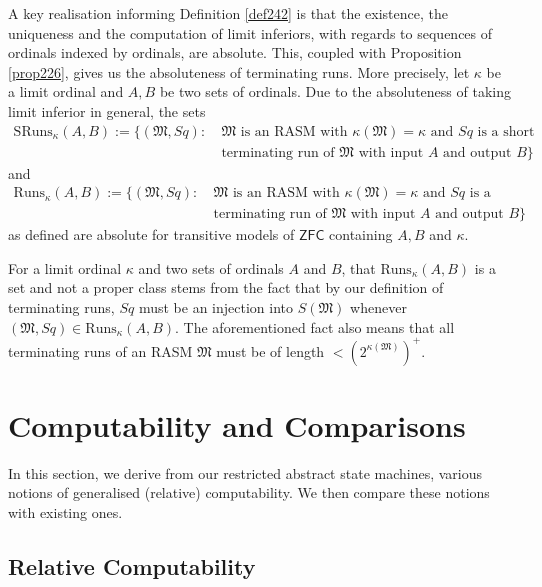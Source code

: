 \documentclass[12pt]{article}
\numberwithin{equation}{section}
\begin{document}
A key realisation informing Definition \ref{def242} is that the existence, the uniqueness and the computation of limit inferiors, with regards to sequences of ordinals indexed by ordinals, are absolute. This, coupled with Proposition \ref{prop226}, gives us the absoluteness of terminating runs. More precisely, let $\kappa$ be a limit ordinal and $A, B$ be two sets of ordinals. Due to the absoluteness of taking limit inferior in general, the sets
\begin{align*}
    \mathrm{SRuns}_{\kappa}(A, B) := \{(\mathfrak{M}, Sq) : \ & \mathfrak{M} \text{ is an RASM with } \kappa(\mathfrak{M}) = \kappa \text{ and } Sq \text{ is a short} \\
    & \text{terminating run of } \mathfrak{M} \text{ with input } A \text{ and output } B\}
\end{align*}
and
\begin{align*}
    \mathrm{Runs}_{\kappa}(A, B) := \{(\mathfrak{M}, Sq) : \ & \mathfrak{M} \text{ is an RASM with } \kappa(\mathfrak{M}) = \kappa \text{ and } Sq \text{ is a} \\
    & \text{terminating run of } \mathfrak{M} \text{ with input } A \text{ and output } B\}
\end{align*}
as defined are absolute for transitive models of $\mathsf{ZFC}$ containing $A, B$ and $\kappa$. 

\begin{rem}\label{rem243}
For a limit ordinal $\kappa$ and two sets of ordinals $A$ and $B$, that $\mathrm{Runs}_{\kappa}(A, B)$ is a set and not a proper class stems from the fact that by our definition of terminating runs, $Sq$ must be an injection into $S(\mathfrak{M})$ whenever $(\mathfrak{M}, Sq) \in \mathrm{Runs}_{\kappa}(A, B)$. The aforementioned fact also means that all terminating runs of an RASM $\mathfrak{M}$ must be of length $< (2^{\kappa(\mathfrak{M})})^+$.
\end{rem}

\section{Computability and Comparisons}

In this section, we derive from our restricted abstract state machines, various notions of generalised (relative) computability. We then compare these notions with existing ones.

\subsection{Relative Computability}
\end{document}
